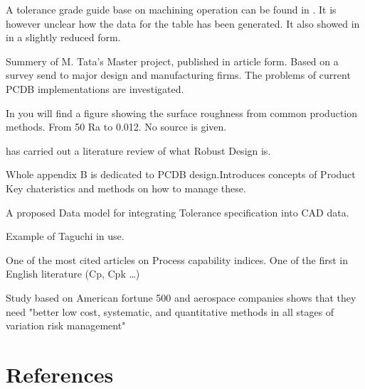 \documentclass[aip,amsmath,reprint, author-year]{revtex4-1}
\begin{document}
A tolerance grade guide base on machining operation can be found in \citet{american1978preferred}. It is however unclear how the data for the table has been generated. It also showed in \citet{united1967preferred} in a slightly reduced form.

\citet{tata1999process} Summery of M. Tata's Master project, published in article form. Based on a survey send to major design and manufacturing firms. The problems of current PCDB implementations are investigated. 

In \citet[p. 715]{oberg2008machinery} you will find a figure showing the surface roughness from common production methods. From 50 Ra to 0.012. No source is given.

\citet{arvidsson2008principles} has carried out a literature review of what Robust Design is.


\citet{thornton2004variation} Whole appendix B is dedicated to PCDB design.Introduces concepts of Product Key chateristics and methods on how to manage these.

\citet{feng1995dimension} A proposed Data model for integrating Tolerance specification into CAD data. 

\citet{yang1998design} Example of Taguchi in use. 

\citet{kane1986process} One of the most cited articles on Process capability indices. One of the first in English literature (Cp, Cpk …)

\citet{thornton2000more}Study based on American fortune 500 and aerospace companies shows that they need "better low cost, systematic, and quantitative methods in all stages of variation risk management"

\section*{References}

\end{document}
